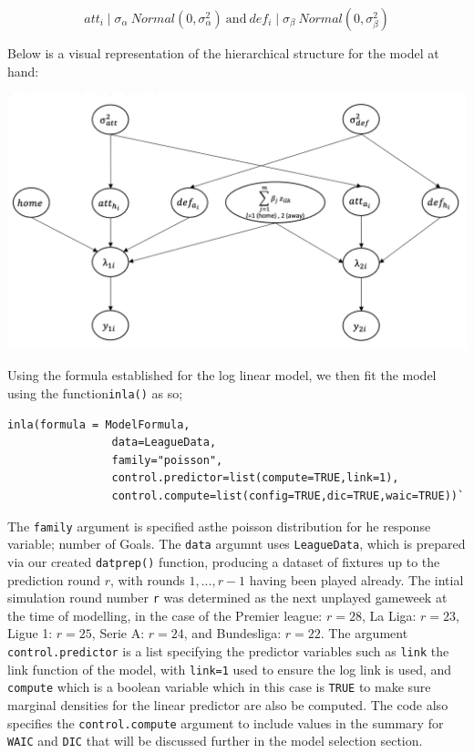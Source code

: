 \documentclass[
]{article}
\begin{document}
\[att_i \mid \sigma_\alpha ~ Normal(0, \sigma^2_\alpha)  \ \text{and}  \ def_i \mid \sigma_\beta ~ Normal(0, \sigma^2_\beta)\]

Below is a visual representation of the hierarchical structure for the
model at hand:

\includegraphics[width=0.7\linewidth,height=0.7\textheight]{DagDisso}

Using the formula established for the log linear model, we then fit the
model using the function\texttt{inla()} as so;

\begin{verbatim}
inla(formula = ModelFormula,
                data=LeagueData,
                family="poisson",
                control.predictor=list(compute=TRUE,link=1),
                control.compute=list(config=TRUE,dic=TRUE,waic=TRUE))`
\end{verbatim}

The \texttt{family} argument is specified asthe poisson distribution for
he response variable; number of Goals. The \texttt{data} argumnt uses
\texttt{LeagueData}, which is prepared via our created
\texttt{datprep()} function, producing a dataset of fixtures up to the
prediction round \(r\), with rounds \(1,..., r-1\) having been played
already. The intial simulation round number \texttt{r} was determined as
the next unplayed gameweek at the time of modelling, in the case of the
Premier league: \(r = 28\), La Liga: \(r = 23\), Ligue 1: \(r = 25\),
Serie A: \(r = 24\), and Bundesliga: \(r = 22\). The argument
\texttt{control.predictor} is a list specifying the predictor variables
such as \texttt{link} the link function of the model, with
\texttt{link=1} used to ensure the log link is used, and
\texttt{compute} which is a boolean variable which in this case is
\texttt{TRUE} to make sure marginal densities for the linear predictor
are also be computed. The code also specifies the
\texttt{control.compute} argument to include values in the summary for
\texttt{WAIC} and \texttt{DIC} that will be discussed further in the
model selection section.
\end{document}
